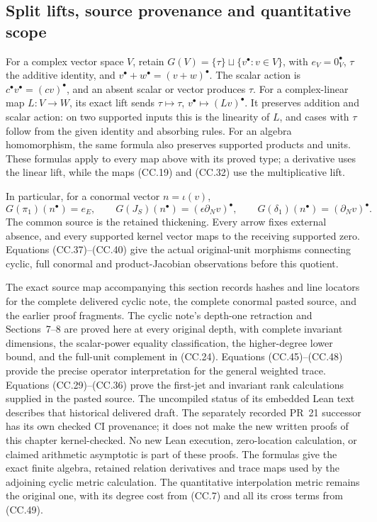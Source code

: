 \subsection{Split lifts, source provenance and quantitative scope}

For a complex vector space \(V\), retain
\(G(V)=\{\tau\}\sqcup\{v^\bullet:v\in V\}\),
with \(e_V=0_V^\bullet\), \(\tau\) the additive identity,
and \(v^\bullet+w^\bullet=(v+w)^\bullet\).
The scalar action is
\(c^\bullet v^\bullet=(cv)^\bullet\), and an absent scalar
or vector produces \(\tau\).  For a complex-linear map
\(L:V\to W\), its exact lift sends
\(\tau\mapsto\tau\), \(v^\bullet\mapsto(Lv)^\bullet\).
It preserves addition and scalar action: on two supported inputs
this is the linearity of \(L\), and cases with \(\tau\) follow
from the given identity and absorbing rules.  For an algebra
homomorphism, the same formula also preserves supported products
and units.  These formulas apply to every map above with its
proved type; a derivative uses the linear lift, while the maps
(CC.19) and (CC.32) use the multiplicative lift.

In particular, for a conormal vector \(n=\iota(v)\),
\[
 G(\pi_1)(n^\bullet)=e_E,\qquad
 G(J_S)(n^\bullet)=(\epsilon\partial_Nv)^\bullet,
 \qquad G(\delta_1)(n^\bullet)=(\partial_Nv)^\bullet.
 \tag{CC.52}
\]
The common source is the retained thickening.  Every arrow fixes
external absence, and every supported kernel vector maps to the
receiving supported zero.  Equations (CC.37)--(CC.40) give the
actual original-unit morphisms connecting cyclic, full conormal
and product-Jacobian observations before this quotient.

The exact source map accompanying this section records hashes and
line locators for the complete delivered cyclic note, the complete
conormal pasted source, and the earlier proof fragments.  The
cyclic note's depth-one retraction and Sections~7--8 are proved
here at every original depth, with complete invariant dimensions,
the scalar-power equality classification, the higher-degree lower
bound, and the full-unit complement in (CC.24).  Equations
(CC.45)--(CC.48) provide the precise operator interpretation for
the general weighted trace.  Equations (CC.29)--(CC.36) prove the
first-jet and invariant rank calculations supplied in the pasted
source.  The uncompiled status of its embedded Lean text describes
that historical delivered draft.  The separately recorded PR~21
successor has its own checked CI provenance; it does not make
the new written proofs of this chapter kernel-checked.
No new Lean execution, zero-location calculation, or claimed
arithmetic asymptotic is part of these proofs.  The formulas give
the exact finite algebra, retained relation derivatives and trace
maps used by the adjoining cyclic metric calculation.  The
quantitative interpolation metric remains the original one, with
its degree cost from (CC.7) and all its cross terms from (CC.49).
